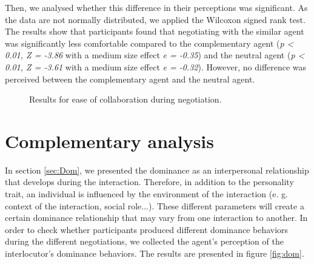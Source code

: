 \documentclass{llncs}
\begin{document}
Then, we analysed whether this difference in their perceptions was significant. As the data are not normally distributed, we applied the Wilcoxon signed rank test. The results show that participants found that negotiating with the similar agent was significantly less comfortable compared to the complementary agent (\emph{p < 0.01, Z = -3.86} with a medium size effect \emph{e = -0.35}) and the neutral agent (\emph{p < 0.01, Z = -3.61} with a medium size effect \emph{e = -0.32}).
However, no difference was perceived between the complementary agent and the neutral agent.

\begin{figure}[h]
	
	
	\caption{Results for ease of collaboration during negotiation.}
	\label{fig:ease}
\end{figure}


\section{Complementary analysis}
In section \ref{sec:Dom}, we presented the dominance as an interpersonal relationship that develops during the interaction. 
Therefore, in addition to the personality trait, an individual is influenced by the environment of the interaction (e. g. context of the interaction, social role...). These different parameters will create a certain dominance relationship that may vary from one interaction to another.  
In order to check whether participants produced different dominance behaviors during the different negotiations, we collected the agent's perception of the interlocutor's dominance behaviors.  The results are presented in figure \ref{fig:dom}.
\end{document}
